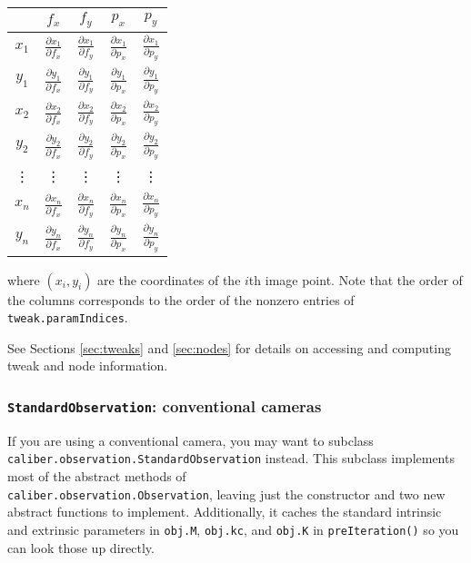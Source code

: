 \begin{center}\begin{tabular}{c|cccc}
    & $f_x$ & $f_y$ & $p_x$ & $p_y$ \\
	\hline
	$x_1$ & $\frac{\partial x_1}{\partial f_x}$ & $\frac{\partial x_1}{\partial f_y}$ & $\frac{\partial x_1}{\partial p_x}$ & $\frac{\partial x_1}{\partial p_y}$ \\
	$y_1$ & $\frac{\partial y_1}{\partial f_x}$ & $\frac{\partial y_1}{\partial f_y}$ & $\frac{\partial y_1}{\partial p_x}$ & $\frac{\partial y_1}{\partial p_y}$ \\
	$x_2$ & $\frac{\partial x_2}{\partial f_x}$ & $\frac{\partial x_2}{\partial f_y}$ & $\frac{\partial x_2}{\partial p_x}$ & $\frac{\partial x_2}{\partial p_y}$ \\
	$y_2$ & $\frac{\partial y_2}{\partial f_x}$ & $\frac{\partial y_2}{\partial f_y}$ & $\frac{\partial y_2}{\partial p_x}$ & $\frac{\partial y_2}{\partial p_y}$ \\
	\vdots & \vdots & \vdots & \vdots & \vdots \\
	$x_n$ & $\frac{\partial x_n}{\partial f_x}$ & $\frac{\partial x_n}{\partial f_y}$ & $\frac{\partial x_n}{\partial p_x}$ & $\frac{\partial x_n}{\partial p_y}$ \\
	$y_n$ & $\frac{\partial y_n}{\partial f_x}$ & $\frac{\partial y_n}{\partial f_y}$ & $\frac{\partial y_n}{\partial p_x}$ & $\frac{\partial y_n}{\partial p_y}$
\end{tabular}\end{center}

where $\left( x_i, y_i \right)$ are the coordinates of the $i$th image point. Note that the order of the columns corresponds to the order of the nonzero
entries of \texttt{tweak.paramIndices}.

See Sections \ref{sec:tweaks} and \ref{sec:nodes} for details on accessing and computing 
tweak and node information.

\subsubsection{\texttt{StandardObservation}: conventional cameras}

If you are using a conventional camera, you may want to subclass \\
\texttt{caliber.observation.StandardObservation}
instead. This subclass implements most of the abstract methods of \\
\texttt{caliber.observation.Observation}, leaving
just the constructor and two new abstract functions to implement. 
Additionally, it caches the standard intrinsic and extrinsic parameters in \texttt{obj.M}, \texttt{obj.kc}, and \texttt{obj.K}
in \texttt{preIteration()} so you can look those up directly.

